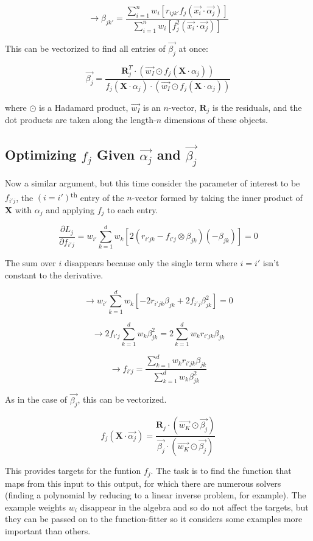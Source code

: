 \documentclass[12pt]{article}
\begin{document}
$$\rightarrow \beta_{jk'} = \frac{\sum_{i=1}^n w_i [r_{ijk'} f_j(\vec{x_i} \cdot \vec{\alpha_j})]}{\sum_{i=1}^n w_i [f_j^2(\vec{x_i} \cdot \vec{\alpha_j})]}$$

This can be vectorized to find all entries of $\vec{\beta_j}$ at once:

$$ \vec{\beta_j} = \frac{\pmb{R}_j^T \cdot (\vec{w_I} \odot f_j(\pmb{X} \cdot \alpha_j))}{f_j(\pmb{X} \cdot \alpha_j) \cdot (\vec{w_I} \odot f_j(\pmb{X} \cdot \alpha_j))}$$

where $\odot$ is a Hadamard product, $\vec{w_I}$ is an $n$-vector, $\pmb{R}_j$ is the residuals, and the dot products are taken along the length-$n$ dimensions of these objects.

\subsection{Optimizing $f_j$ Given $\vec{\alpha_j}$ and $\vec{\beta_j}$}

Now a similar argument, but this time consider the parameter of interest to be $f_{i'j}$, the $(i=i')$\textsuperscript{th} entry of the $n$-vector formed by taking the inner product of $\pmb{X}$ with $\alpha_j$ and applying $f_j$ to each entry.


$$\frac{\partial L_j}{\partial f_{i'j}} = w_{i'} \sum_{k=1}^d w_k [2(r_{i'jk} - f_{i'j} \otimes \beta_{jk})(-\beta_{jk})] = 0$$

The sum over $i$ disappears because only the single term where $i=i'$ isn't constant to the derivative.

$$\rightarrow w_{i'} \sum_{k=1}^d w_k [-2 r_{i'jk} \beta_{jk} + 2 f_{i'j} \beta_{jk}^2 ] = 0$$

$$\rightarrow 2 f_{i'j} \sum_{k=1}^d w_k \beta_{jk}^2 = 2 \sum_{k=1}^d w_k r_{i'jk} \beta_{jk}$$

$$\rightarrow f_{i'j} = \frac{\sum_{k=1}^d w_k r_{i'jk} \beta_{jk}}{\sum_{k=1}^d w_k \beta_{jk}^2}$$

As in the case of $\vec{\beta_j}$, this can be vectorized.

$$ f_j(\pmb{X} \cdot \vec{\alpha_j}) = \frac{\pmb{R}_j \cdot (\vec{w_K} \odot \vec{\beta_j})}{\vec{\beta_j} \cdot (\vec{w_K} \odot \vec{\beta_j})}$$

This provides targets for the funtion $f_j$. The task is to find the function that maps from this input to this output, for which there are numerous solvers (finding a polynomial by reducing to a linear inverse problem, for example). The example weights $w_i$ disappear in the algebra and so do not affect the targets, but they can be passed on to the function-fitter so it considers some examples more important than others.
\end{document}
